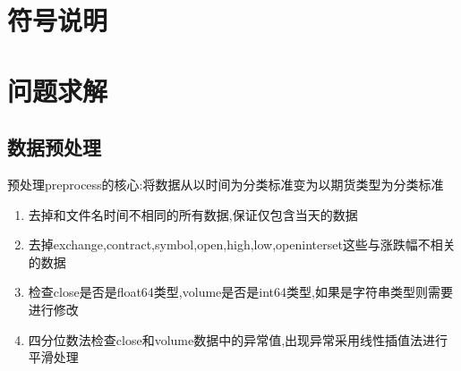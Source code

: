 \documentclass[a4paper,11pt]{ctexart}
\begin{document}
\newpage
\section{符号说明}

\section{问题求解}




\subsection{数据预处理}
预处理preprocess的核心:将数据从以时间为分类标准变为以期货类型为分类标准
\begin{enumerate}
\item 去掉和文件名时间不相同的所有数据,保证仅包含当天的数据
\item 去掉exchange,contract,symbol,open,high,low,openinterset这些与涨跌幅不相关的数据
\item 检查close是否是float64类型,volume是否是int64类型,如果是字符串类型则需要进行修改
\item 四分位数法检查close和volume数据中的异常值,出现异常采用线性插值法进行平滑处理
\end{enumerate}
\end{document}
